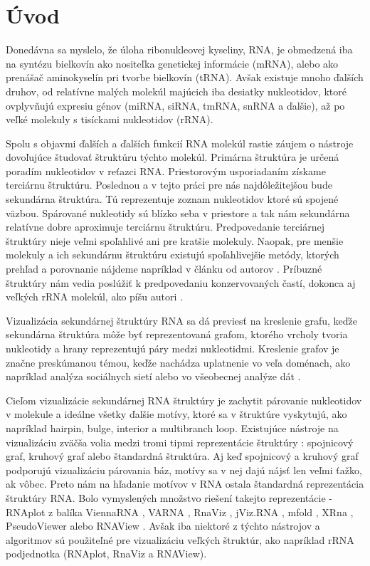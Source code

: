 
\chapter*{Úvod}

Donedávna sa myslelo, že úloha ribonukleovej kyseliny, RNA, je obmedzená
iba na syntézu bielkovín ako nositeľka genetickej informácie (mRNA),
alebo ako prenášač aminokyselín pri tvorbe bielkovín (tRNA).
Avšak existuje mnoho ďalších druhov, od relatívne malých molekúl majúcich
iba desiatky nukleotidov, ktoré ovplyvňujú expresiu génov (miRNA, siRNA, tmRNA, snRNA a ďalšie),
až po veľké molekuly s tisíckami nukleotidov (rRNA).

Spolu s objavmi ďalších a ďalších funkcií RNA molekúl rastie záujem o nástroje dovoľujúce
študovať štruktúru týchto molekúl.
Primárna štruktúra je určená poradím nukleotidov v reťazci RNA. Priestorovým usporiadaním
získame terciárnu štruktúru. Poslednou a v tejto práci pre nás najdôležitejšou
bude sekundárna štruktúra. Tú reprezentuje zoznam nukleotidov ktoré sú spojené väzbou.
Spárované nukleotidy sú blízko seba v priestore a tak nám sekundárna relatívne
dobre aproximuje terciárnu štruktúru. Predpovedanie terciárnej štruktúry nieje veľmi
spoľahlivé ani pre kratšie molekuly. Naopak, pre menšie molekuly a ich  sekundárnu
štruktúru existujú spoľahlivejšie metódy, ktorých prehľad a porovnanie nájdeme napríklad
v článku od autorov \citet{SEC_STR_PREDICT_TOOLS}.
Príbuzné štruktúry nám vedia poslúžiť k predpovedaniu konzervovaných častí, dokonca
aj veľkých rRNA molekúl, ako píšu autori \citet{SEC_STR_PREDICTION}.

Vizualizácia sekundárnej štruktúry RNA sa dá previesť na kreslenie grafu, keďže
sekundárna štruktúra môže byť reprezentovaná grafom, ktorého vrcholy tvoria
nukleotidy a hrany reprezentujú páry medzi nukleotidmi.
Kreslenie grafov je značne preskúmanou témou, keďže nachádza uplatnenie vo veľa
doménach, ako napríklad analýza sociálnych sietí 
alebo vo všeobecnej analýze dát .

Cieľom vizualizácie sekundárnej RNA štruktúry je zachytit párovanie nukleotidov
v molekule a ideálne všetky ďalšie motívy, ktoré sa v štruktúre vyskytujú,
ako napríklad hairpin, bulge, interior a multibranch loop.
Existujúce nástroje na vizualizáciu zväčša volia medzi tromi tipmi reprezentácie
štruktúry : spojnicový graf, kruhový graf alebo štandardná štruktúra.
Aj keď spojnicový a kruhový graf podporujú vizualizáciu párovania báz, motívy
sa v nej dajú nájsť len veľmi ťažko, ak vôbec.
Preto nám na hľadanie motívov v RNA ostala štandardná reprezentácia štruktúry RNA.
Bolo vymyslených množstvo riešení takejto reprezentácie -
RNAplot z balíka ViennaRNA , VARNA ,
RnaViz , jViz.RNA , mfold ,
XRna , PseudoViewer  alebo
RNAView .
Avšak iba niektoré z týchto nástrojov a algoritmov sú použiteľné pre vizualizáciu
veľkých štruktúr, ako napríklad rRNA podjednotka (RNAplot, RnaViz a RNAView).


